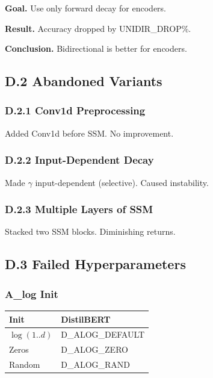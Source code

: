 \textbf{Goal.} Use only forward decay for encoders.

\textbf{Result.} Accuracy dropped by {{UNIDIR\_DROP}}\%.

\textbf{Conclusion.} Bidirectional is better for encoders.

\subsection{D.2 Abandoned Variants}

\subsubsection{D.2.1 Conv1d Preprocessing}

Added Conv1d before SSM. No improvement.

\subsubsection{D.2.2 Input-Dependent Decay}

Made $\gamma$ input-dependent (selective). Caused instability.

\subsubsection{D.2.3 Multiple Layers of SSM}

Stacked two SSM blocks. Diminishing returns.

\subsection{D.3 Failed Hyperparameters}

\subsubsection{A\_log Init}

\begin{table}[H]
\centering
\small
\begin{tabular}{ll}
\toprule
\textbf{Init} & \textbf{DistilBERT} \\
\midrule
$\log(1..d)$ & {{D\_ALOG\_DEFAULT}} \\
Zeros & {{D\_ALOG\_ZERO}} \\
Random & {{D\_ALOG\_RAND}} \\
\bottomrule
\end{tabular}
\end{table}

